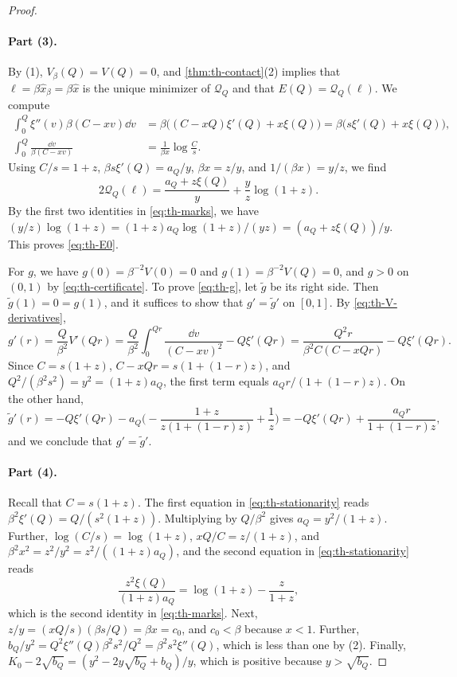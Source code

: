 \begin{proof}
\paragraph{Part (3).}
By (1), $V_\beta(Q)=V(Q)=0$, and \cref{thm:th-contact}(2) implies that $\ell=\beta\hat x_\beta=\beta\hat x$ is the unique minimizer of $\mathcal Q_Q$ and that $E(Q)=\mathcal Q_Q(\ell)$. We compute
\[
\begin{aligned}
\int_0^Q\xi''(v)\beta(C-xv)\dd v&=\beta\big((C-xQ)\xi'(Q)+x\xi(Q)\big)=\beta\big(s\xi'(Q)+x\xi(Q)\big),\\
\int_0^Q\frac{\dd v}{\beta(C-xv)}&=\frac1{\beta x}\log\frac Cs.
\end{aligned}
\]
Using $C/s=1+z$, $\beta s\xi'(Q)=a_Q/y$, $\beta x=z/y$, and $1/(\beta x)=y/z$, we find
\[
2\mathcal Q_Q(\ell)=\frac{a_Q+z\xi(Q)}y+\frac yz\log(1+z).
\]
By the first two identities in \eqref{eq:th-marks}, we have $(y/z)\log(1+z)=(1+z)a_Q\log(1+z)/(yz)=(a_Q+z\xi(Q))/y$. This proves \eqref{eq:th-E0}.

For $g$, we have $g(0)=\beta^{-2}V(0)=0$ and $g(1)=\beta^{-2}V(Q)=0$, and $g>0$ on $(0,1)$ by \eqref{eq:th-certificate}. To prove \eqref{eq:th-g}, let $\tilde g$ be its right side. Then $\tilde g(1)=0=g(1)$, and it suffices to show that $g'=\tilde g'$ on $[0,1]$. By \eqref{eq:th-V-derivatives},
\[
g'(r)=\frac Q{\beta^2}V'(Qr)=\frac Q{\beta^2}\int_0^{Qr}\frac{\dd v}{(C-xv)^2}-Q\xi'(Qr)=\frac{Q^2r}{\beta^2C(C-xQr)}-Q\xi'(Qr).
\]
Since $C=s(1+z)$, $C-xQr=s(1+(1-r)z)$, and $Q^2/(\beta^2s^2)=y^2=(1+z)a_Q$, the first term equals $a_Qr/(1+(1-r)z)$. On the other hand,
\[
\tilde g'(r)=-Q\xi'(Qr)-a_Q\Big(-\frac{1+z}{z(1+(1-r)z)}+\frac1z\Big)=-Q\xi'(Qr)+\frac{a_Qr}{1+(1-r)z},
\]
and we conclude that $g'=\tilde g'$.

\paragraph{Part (4).}
Recall that $C=s(1+z)$. The first equation in \eqref{eq:th-stationarity} reads $\beta^2\xi'(Q)=Q/(s^2(1+z))$. Multiplying by $Q/\beta^2$ gives $a_Q=y^2/(1+z)$. Further, $\log(C/s)=\log(1+z)$, $xQ/C=z/(1+z)$, and $\beta^2x^2=z^2/y^2=z^2/((1+z)a_Q)$, and the second equation in \eqref{eq:th-stationarity} reads
\[
\frac{z^2\xi(Q)}{(1+z)a_Q}=\log(1+z)-\frac z{1+z},
\]
which is the second identity in \eqref{eq:th-marks}. Next, $z/y=(xQ/s)(\beta s/Q)=\beta x=c_0$, and $c_0<\beta$ because $x<1$. Further, $b_Q/y^2=Q^2\xi''(Q)\beta^2s^2/Q^2=\beta^2s^2\xi''(Q)$, which is less than one by (2). Finally, $K_0-2\sqrt{b_Q}=(y^2-2y\sqrt{b_Q}+b_Q)/y$, which is positive because $y>\sqrt{b_Q}$.


\end{proof}
